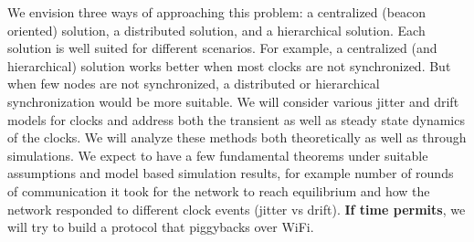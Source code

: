 \documentclass[11pt, draftclsnofoot, onecolumn]{IEEEtran}
\begin{document}
We envision three ways of approaching this problem: a centralized (beacon oriented) solution,  a distributed solution, and a hierarchical solution.
Each solution is well suited for different scenarios.
For example, a centralized (and hierarchical) solution works better when most clocks are not synchronized. But when few nodes are not synchronized, a distributed or hierarchical synchronization would be more suitable.
We will consider various jitter and drift models for clocks and address both the transient as well as steady state dynamics of the clocks.
We will analyze these methods both theoretically as well as through simulations. We expect to have a few fundamental theorems under suitable assumptions and model based simulation results, for example number of rounds of communication it took for the network to reach equilibrium and how the network responded to different clock events (jitter vs drift). \textbf{If time permits}, we will try to build a protocol that piggybacks over WiFi.



\end{document}
